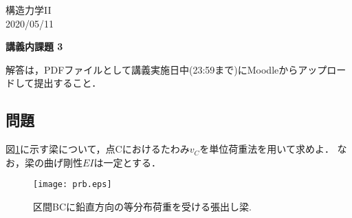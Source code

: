 \documentclass[10pt,a4j]{jarticle}
\newlength{\minitwocolumn}
\begin{document}
\newcommand{\fat}[1]{\mbox{\boldmath $#1$}}
\newcommand{\D}{\partial}
\newcommand{\w}{\omega}
\newcommand{\ga}{\alpha}
\newcommand{\gb}{\beta}
\newcommand{\gx}{\xi}
\newcommand{\gz}{\zeta}
\newcommand{\vhat}[1]{\hat{\fat{#1}}}
\newcommand{\spc}{\vspace{0.7\baselineskip}}
\newcommand{\halfspc}{\vspace{0.3\baselineskip}}

\newcommand{\twofig}[2]
 {
   \begin{figure}
     \begin{minipage}[t]{\minitwocolumn}
         \begin{center}   #1
         \end{center}
     \end{minipage}
         \hspace{\columnsep}
     \begin{minipage}[t]{\minitwocolumn}
         \begin{center} #2
         \end{center}
     \end{minipage}
   \end{figure}
 }
\begin{flushright}
	構造力学II\\
	 2020/05/11
\end{flushright}
\begin{center}
	{\LARGE	\bf 講義内課題 3 } 
\end{center}
\vspace{10mm}
解答は，PDFファイルとして講義実施日中(23:59まで)にMoodleからアップロードして提出すること．
\subsection*{問題}
図\ref{fig:prb}に示す梁について，点Cにおけるたわみ$v_C$を単位荷重法を用いて求めよ．
なお，梁の曲げ剛性$EI$は一定とする．
\begin{figure}[h]
	\begin{center}
	\texttt{[image: prb.eps]} 
	\end{center}
	\caption{区間BCに鉛直方向の等分布荷重を受ける張出し梁.} 
	\label{fig:prb}
\end{figure}
\end{document}
